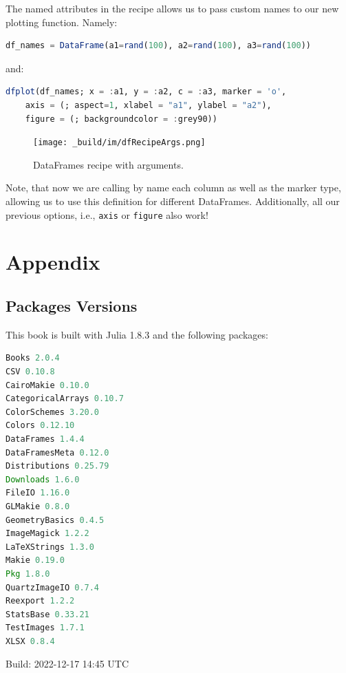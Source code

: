 \documentclass[
  notoc %
]{tufte-book}
\newcommand{\passthrough}[1]{#1}
\begin{document}
The named attributes in the recipe allows us to pass custom names to our
new plotting function. Namely:

\begin{lstlisting}[language=Julia]
df_names = DataFrame(a1=rand(100), a2=rand(100), a3=rand(100))
\end{lstlisting}

and:

\begin{lstlisting}[language=Julia]
dfplot(df_names; x = :a1, y = :a2, c = :a3, marker = 'o',
    axis = (; aspect=1, xlabel = "a1", ylabel = "a2"),
    figure = (; backgroundcolor = :grey90))
\end{lstlisting}

\begin{figure}
\hypertarget{fig:dfRecipeArgs}{%
\centering
\texttt{[image: \_build/im/dfRecipeArgs.png]}
\caption{DataFrames recipe with arguments.}\label{fig:dfRecipeArgs}
}
\end{figure}

Note, that now we are calling by name each column as well as the marker
type, allowing us to use this definition for different DataFrames.
Additionally, all our previous options, i.e.,
\passthrough{\lstinline!axis!} or \passthrough{\lstinline!figure!} also
work!

\hypertarget{sec:appendix}{%
\chapter{Appendix}\label{sec:appendix}}

\hypertarget{sec:appendix_pkg}{%
\section{Packages Versions}\label{sec:appendix_pkg}}

This book is built with Julia 1.8.3 and the following packages:

\begin{lstlisting}[language=Julia]
Books 2.0.4
CSV 0.10.8
CairoMakie 0.10.0
CategoricalArrays 0.10.7
ColorSchemes 3.20.0
Colors 0.12.10
DataFrames 1.4.4
DataFramesMeta 0.12.0
Distributions 0.25.79
Downloads 1.6.0
FileIO 1.16.0
GLMakie 0.8.0
GeometryBasics 0.4.5
ImageMagick 1.2.2
LaTeXStrings 1.3.0
Makie 0.19.0
Pkg 1.8.0
QuartzImageIO 0.7.4
Reexport 1.2.2
StatsBase 0.33.21
TestImages 1.7.1
XLSX 0.8.4
\end{lstlisting}

Build: 2022-12-17 14:45 UTC
\end{document}
